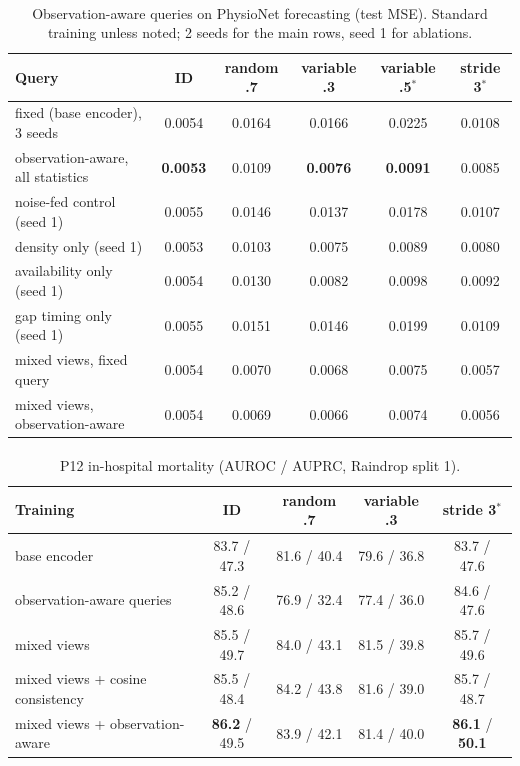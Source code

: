 \documentclass[sigconf,nonacm]{acmart}
\newcommand{\prelim}{\textsuperscript{\dag}}
\begin{document}
\begin{table}[t]
\caption{Observation-aware queries on PhysioNet forecasting (test MSE\prelim). Standard training unless noted;
2 seeds for the main rows, seed 1 for ablations.}
\label{tab:adaptive}
\small
\begin{tabular}{lccccc}
\toprule
Query & ID & random .7 & variable .3 & variable .5$^*$ & stride 3$^*$ \\
\midrule
fixed (base encoder), 3 seeds & 0.0054 & 0.0164 & 0.0166 & 0.0225 & 0.0108 \\
observation-aware, all statistics & \textbf{0.0053} & 0.0109 & \textbf{0.0076} & \textbf{0.0091} & 0.0085 \\
\midrule
noise-fed control (seed 1) & 0.0055 & 0.0146 & 0.0137 & 0.0178 & 0.0107 \\
density only (seed 1) & 0.0053 & 0.0103 & 0.0075 & 0.0089 & 0.0080 \\
availability only (seed 1) & 0.0054 & 0.0130 & 0.0082 & 0.0098 & 0.0092 \\
gap timing only (seed 1) & 0.0055 & 0.0151 & 0.0146 & 0.0199 & 0.0109 \\
\midrule
mixed views, fixed query & 0.0054 & 0.0070 & 0.0068 & 0.0075 & 0.0057 \\
mixed views, observation-aware & 0.0054 & 0.0069 & 0.0066 & 0.0074 & 0.0056 \\
\bottomrule
\end{tabular}
\end{table}

\begin{table}[t]
\caption{P12 in-hospital mortality (AUROC / AUPRC, Raindrop split 1\prelim).}
\label{tab:cls}
\small
\begin{tabular}{lcccc}
\toprule
Training & ID & random .7 & variable .3 & stride 3$^*$ \\
\midrule
base encoder & 83.7 / 47.3 & 81.6 / 40.4 & 79.6 / 36.8 & 83.7 / 47.6 \\
observation-aware queries & 85.2 / 48.6 & 76.9 / 32.4 & 77.4 / 36.0 & 84.6 / 47.6 \\
mixed views & 85.5 / 49.7 & 84.0 / 43.1 & 81.5 / 39.8 & 85.7 / 49.6 \\
mixed views + cosine consistency & 85.5 / 48.4 & 84.2 / 43.8 & 81.6 / 39.0 & 85.7 / 48.7 \\
mixed views + observation-aware & \textbf{86.2} / 49.5 & 83.9 / 42.1 & 81.4 / 40.0 & \textbf{86.1} / \textbf{50.1} \\
\bottomrule
\end{tabular}
\end{table}
\end{document}
